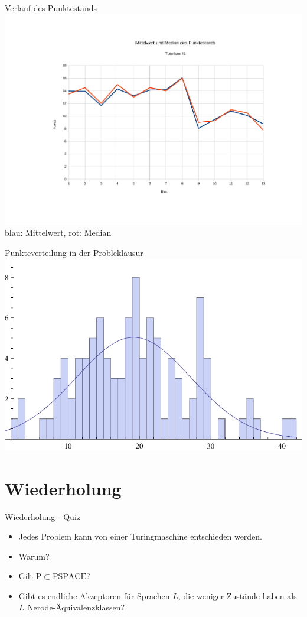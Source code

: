 \begin{frame}{Verlauf des Punktestands}
    \includegraphics[scale=0.35]{graphics/14/punkte2.pdf}\\
    blau: Mittelwert, rot: Median
\end{frame}
\begin{frame}{Punkteverteilung in der Probleklausur}
    \includegraphics[scale=0.9]{graphics/14/probeklausur1.pdf}
\end{frame}
\section{Wiederholung}
\begin{frame}{Wiederholung - Quiz}
    \begin{itemize}
        \item Jedes Problem kann von einer Turingmaschine entschieden werden. 
        \item Warum? 
        \item Gilt $\mathrm{P} \subset \mathrm{PSPACE}$? 
        \item Gibt es endliche Akzeptoren für Sprachen $L$, die weniger Zustände haben als $L$ Nerode-Äquivalenzklassen? 
    \end{itemize}
\end{frame}
